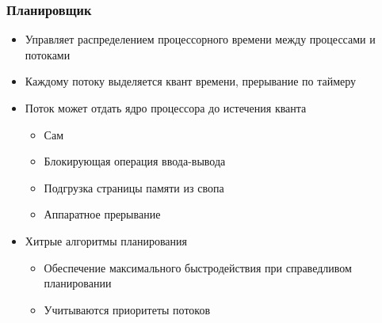 \documentclass[xetex,mathserif,serif]{beamer}
\begin{document}
    \begin{frame}
        \frametitle{Планировщик}
        \begin{itemize}
            \item Управляет распределением процессорного времени между процессами и потоками
            \item Каждому потоку выделяется квант времени, прерывание по таймеру
            \item Поток может отдать ядро процессора до истечения кванта
            \begin{itemize}
                \item Сам
                \item Блокирующая операция ввода-вывода
                \item Подгрузка страницы памяти из свопа
                \item Аппаратное прерывание
            \end{itemize}
            \item Хитрые алгоритмы планирования
            \begin{itemize}
                \item Обеспечение максимального быстродействия при справедливом планировании
                \item Учитываются приоритеты потоков
            \end{itemize}
        \end{itemize}
    \end{frame}
\end{document}
